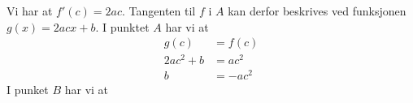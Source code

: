 \newpage

\newpage
{}
 Vi har at $f'(c)=2ac$. Tangenten til $f$ i $A$ kan derfor beskrives ved funksjonen $g(x)=2acx+b$. I punktet $A$ har vi at
\begin{align*}
	g(c) &= f(c) \\
	2ac^2+b &= ac^2 \\
	b &= -ac^2
\end{align*}
I punket $B$ har vi at

